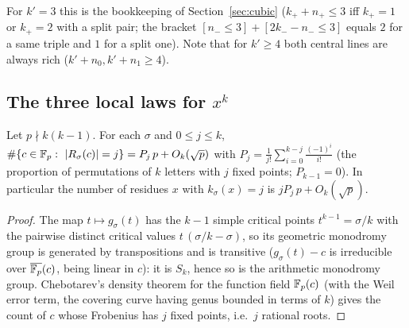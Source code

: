For $k'=3$ this is the bookkeeping of Section~\ref{sec:cubic} ($k_++n_+\le3$ iff $k_+=1$ or $k_+=2$ with a split pair; the bracket $[n_-\le3]+[2k_--n_-\le3]$
equals $2$ for a same triple and $1$ for a split one).  Note that for $k'\ge4$ both central lines are always rich ($k'+n_0,k'+n_1\ge4$).

\subsection*{The three local laws for $x^k$}

\begin{lemma}\label{lem:rootcounts}
Let $p\nmid k(k-1)$.  For each $\sigma$ and $0\le j\le k$,
$\#\{c\in\Fp:\ |R_\sigma(c)|=j\}=P_j\,p+O_k(\sqrt p)$ with $P_j=\frac1{j!}\sum_{i=0}^{k-j}\frac{(-1)^i}{i!}$ (the proportion of permutations of $k$ letters with
$j$ fixed points; $P_{k-1}=0$).  In particular the number of residues $x$ with $k_\sigma(x)=j$ is $jP_j\,p+O_k(\sqrt p)$.
\end{lemma}
\begin{proof}
The map $t\mapsto g_\sigma(t)$ has the $k-1$ simple critical points $t^{k-1}=\sigma/k$ with the pairwise distinct critical values $t\,(\sigma/k-\sigma)$,
so its geometric monodromy group is generated by transpositions and is transitive ($g_\sigma(t)-c$ is irreducible over $\overline{\mathbb{F}_p}(c)$, being linear in
$c$): it is $S_k$, hence so is the arithmetic monodromy group.  Chebotarev's density theorem for the function field $\mathbb{F}_p(c)$ (with the Weil error term, the
covering curve having genus bounded in terms of $k$) gives the count of $c$ whose Frobenius has $j$ fixed points, i.e.\ $j$ rational roots.
\end{proof}


